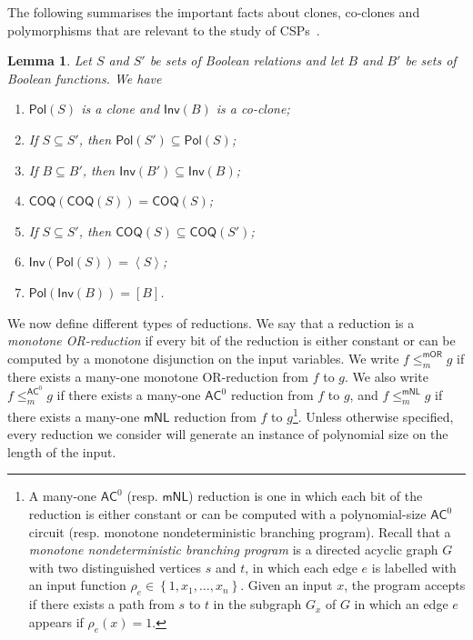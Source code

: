 \documentclass[10pt,a4paper]{article}
\newtheorem{lemma}[theorem]{Lemma}
\newcommand{\complexityfont}[1]{\mathsf{#1}}
\newcommand{\monclass}[1]{\mathsf{m}#1}
\newcommand\NL           {\complexityfont{NL}}
\def\mNL          {\monclass{\NL}}
\def\AC           {\complexityfont{AC}}
\def\sseq{\subseteq}
\newcommand{\set}[1]{\left\{#1\right\}}
\newcommand{\brkt}[1]{\left\langle #1 \right\rangle}
\newcommand{\COQ}{\mathsf{COQ}}
\newcommand{\Pol}{\mathsf{Pol}}
\newcommand{\Inv}{\mathsf{Inv}}
\newcommand{\ccln}[1]{\brkt{#1}}
\newcommand{\acmred}{\leq^{\AC^0}_m\!}
\newcommand{\mnlmred}{\leq^{\mNL}_m}
\newcommand{\mormred}{\leq^{\mathsf{mOR}}_m}
\begin{document}
The following summarises the important facts about
clones, co-clones and polymorphisms that are relevant to
the study of CSPs~\cite{10.1145/263867.263489}. 

\begin{lemma}
    \label{lem:galois}
    Let 
    $S$ 
    and $S'$
    be sets
    of Boolean relations 
    and
    let
    $B$ 
    and $B'$
    be sets
    of Boolean functions.
    We have
    \begin{enumerate}[label=(\roman*)]
        \item 
            \label{item:pol-clone}
            $\Pol(S)$ is a clone and $\Inv(B)$ is a co-clone;
        \item 
            \label{item:pol-invert}
            If 
            $S \sseq S'$,
            then
            $\Pol(S') \sseq \Pol(S)$;
        \item 
            \label{item:inv-invert}
            If 
            $B \sseq B'$,
            then
            $\Inv(B') \sseq \Inv(B)$;
        \item 
            \label{item:coq-idempotent}
            $\COQ(\COQ(S)) = \COQ(S)$;
        \item 
            \label{item:coq-sseq}
            If $S \sseq S'$, then
            $\COQ(S) \sseq \COQ(S')$;
        \item 
            \label{item:invpol}
            $\Inv(\Pol(S)) = \ccln{S}$;
        \item 
            \label{item:polinv}
            $\Pol(\Inv(B)) = [B]$.
    \end{enumerate}
\end{lemma}

We now define 
different
types of reductions.
We say that a reduction is a \emph{monotone OR-reduction}
if
every bit of the reduction is either constant
or can be computed by a monotone disjunction on the
input variables.
We write $f \mormred g$ if 
there exists a many-one monotone OR-reduction
from $f$ to $g$.
We also write 
$f \acmred g$
if 
there exists a many-one
$\AC^0$ reduction
from $f$ to $g$,
and
$f \mnlmred g$
if 
there exists a many-one
$\mNL$ reduction
from $f$ to $g$\footnote{A many-one $\AC^0$ (resp. $\mNL$) reduction is one
in which each bit of the reduction is either constant or 
can be computed with a polynomial-size $\AC^0$ circuit
(resp. monotone nondeterministic branching program). 
Recall that a 
\emph{monotone nondeterministic branching program} 
is a directed acyclic graph $G$ with two
distinguished vertices $s$ and $t$, 
in which each edge $e$ is labelled with an input function 
$\rho_e \in \set{1,x_1,\dots,x_n}$. 
Given an input $x$, the program accepts if there
exists a path from $s$ to $t$ in the subgraph $G_x$ of $G$ 
in which an edge $e$ appears if $\rho_e(x)=1$.
}.
Unless otherwise specified, every reduction we consider will generate an instance
of polynomial size on the length of the input.
\end{document}
